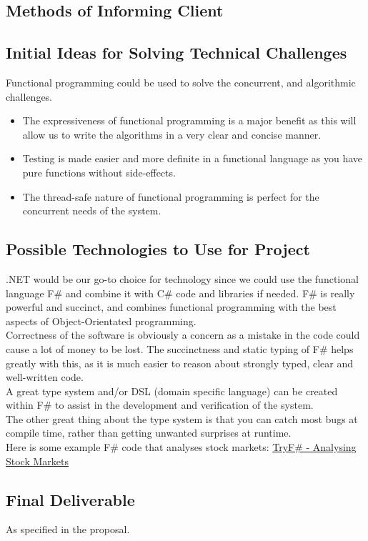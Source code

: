 \documentclass{article}
\begin{document}
	\subsection{Methods of Informing Client}
	
	\subsection{Initial Ideas for Solving Technical Challenges}
	Functional programming could be used to solve the concurrent, and algorithmic challenges.
	\begin{itemize}
		\item The expressiveness of functional programming is a major benefit as this will allow us to write the algorithms in a very clear and concise manner.
		\item Testing is made easier and more definite in a functional language as you have pure functions without side-effects.
		\item The thread-safe nature of functional programming is perfect for the concurrent needs of the system.
	\end{itemize}

	\subsection{Possible Technologies to Use for Project}
	.NET would be our go-to choice for technology since we could use the functional language F\# and combine it with C\# code and libraries if needed. F\# is really powerful and succinct, and combines functional programming with the best aspects of Object-Orientated programming. \\

	Correctness of the software is obviously a concern as a mistake in the code could cause a lot of money to be lost. The succinctness and static typing of F\# helps greatly with this, as it is much easier to reason about strongly typed, clear and well-written code.\\

	A great type system and/or DSL (domain specific language) can be created within F\# to assist in the development and verification of the system.\\

	The other great thing about the type system is that you can catch most bugs at compile time, rather than getting unwanted surprises at runtime. \\

	Here is some example F\# code that analyses stock markets: \href{http://www.tryfsharp.org/Learn/financial-computing#analyzing-stock-markets}{TryF\# - Analysing Stock Markets}

	\subsection{Final Deliverable}
	As specified in the proposal.
\end{document}
